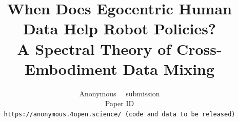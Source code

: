 \documentclass[10pt,twocolumn,letterpaper]{article}
\title{When Does Egocentric Human Data Help Robot Policies?\\
A Spectral Theory of Cross-Embodiment Data Mixing}
\author{Anonymous \confName~\confYear~submission\\
Paper ID \paperID\\
{\tt\small https://anonymous.4open.science/ (code and data to be released)}
}
\begin{document}
\maketitle









{
    \small
    
    
}

% 
\end{document}
